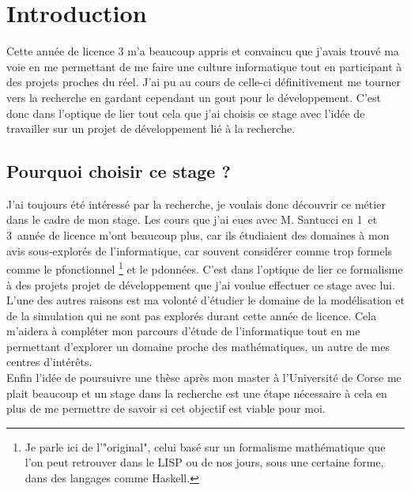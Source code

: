 \documentclass{rapport_stage}
\begin{document}



\chapter*{Introduction}  %

Cette année de licence 3 m'a beaucoup appris et convaincu que j'avais trouvé ma
voie en me permettant de me faire une culture informatique tout en participant
à des projets proches du réel. J'ai pu au cours de celle-ci définitivement me
tourner vers la recherche en gardant cependant un gout pour le développement.
C'est donc dans l'optique de lier tout cela que j'ai choisis ce stage avec
l'idée de travailler sur un projet de développement lié à la recherche.

\section*{Pourquoi choisir ce stage ?}

J'ai toujours été intéressé par la recherche, je voulais donc découvrir ce
métier dans le cadre de mon stage. Les cours que j'ai eues avec M. Santucci en
1\iere \ et 3\ieme \ année de licence m'ont beaucoup plus, car ils étudiaient des domaines à mon avis sous-explorés de l'informatique, car souvent considérer comme trop formels
comme le \gls{pfonctionnel}
\footnote{Je parle ici de l'"original", celui basé sur un formalisme mathématique que l'on peut retrouver dans le LISP ou de nos jours, sous une certaine forme, dans des langages comme Haskell.}
et le \gls{pdonnées}. C'est dans l'optique de lier ce formalisme à des projets projet de développement que j'ai voulue effectuer ce stage avec lui.\\

L'une des autres raisons est ma volonté d'étudier le domaine de la modélisation et de la
simulation qui ne sont pas explorés durant cette année de licence. Cela
m'aidera à compléter mon parcours d'étude de l'informatique tout en me permettant
d'explorer un domaine proche des mathématiques, un autre de mes centres d'intérêts. \\

Enfin l'idée de poursuivre une thèse après mon master à l'Université de Corse
me plait beaucoup et un stage dans la recherche est une étape nécessaire à
cela en plus de me permettre de savoir si cet objectif est viable pour moi.
\end{document}

